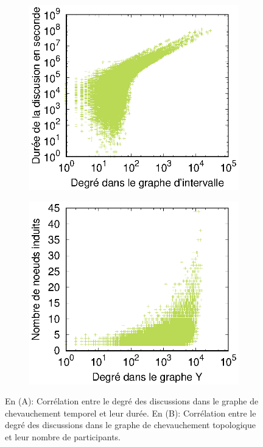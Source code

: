 \begin{figure}
\centering
	\begin{subfigure}{0.4\textwidth}
		\includegraphics[width=\linewidth]{img/mailing/degree_temp}
		\caption{\label{fig:x-y-graphs_discu_temp}}		
	\end{subfigure}
	\begin{subfigure}{0.4\textwidth}
		\includegraphics[width=\linewidth]{img/mailing/degree_nodes}
		\caption{\label{fig:x-y-graphs_discu_node}}	
	\end{subfigure}
	
	
	\caption{En (A): Corrélation entre le degré des discussions dans le graphe de chevauchement temporel et leur durée. En (B): Corrélation entre le degré des discussions dans le graphe de chevauchement topologique et leur nombre de participants.}
	\label{fig:x-y-graphs_discu}
\end{figure}

